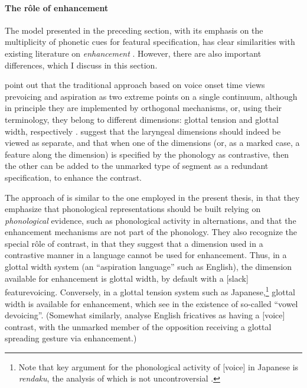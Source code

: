\paragraph{The rôle of enhancement}
\label{sec:role-enhancement}

The model presented in the preceding section, with its emphasis on the multiplicity of phonetic cues for featural specification, has clear similarities with existing literature on \emph{enhancement} \citep[see especially][]{stevens89:_primar_featur_their_enhan_conson,stevens10:_quant,keyser06:_enhan_overl_speec_chain,avery01:_laryn}. However, there are also important differences, which I discuss in this section.

\citet{avery01:_laryn} point out that the traditional approach based on voice onset time \citep{lisker64} views prevoicing and aspiration as two extreme points on a single continuum, although in principle they are implemented by orthogonal mechanisms, or, using their terminology, they belong to different dimensions: glottal tension and glottal width, respectively \citep[\cf also][]{vaux05}. \citeauthor{avery01:_laryn} suggest that the laryngeal dimensions should indeed be viewed as separate, and that when one of the dimensions (or, as a marked case, a feature along the dimension) is specified by the phonology as contrastive, then the other can be added to the unmarked type of segment as a redundant specification, to enhance the contrast.

The approach of \citet{avery01:_laryn} is similar to the one employed in the present thesis, in that they emphasize that phonological representations should be built relying on \emph{phonological} evidence, such as phonological activity in alternations, and that the enhancement mechanisms are not part of the phonology. They also recognize the special rôle of contrast, in that they suggest that a dimension used in a contrastive manner in a language cannot be used for enhancement. Thus, in a glottal width system (\ie an \enquote{aspiration language} such as English), the dimension available for enhancement is glottal width, by default with a [slack] feature\dash\ie voicing. Conversely, in a glottal tension system such as Japanese,\footnote{Note that  key argument for the phonological activity of [voice] in Japanese is \emph{rendaku}, the analysis of which is not uncontroversial \citep[\egm][]{lexiconopt,ito95:_japan}.} glottal width is available for enhancement, which \citet{avery01:_laryn} see in the existence of so-called \enquote{vowel devoicing}. (Somewhat similarly, \citealt{tsuchida00:_sonor_englis} analyse English fricatives as having a [voice] contrast, with the unmarked member of the opposition receiving a glottal spreading gesture via enhancement.)

